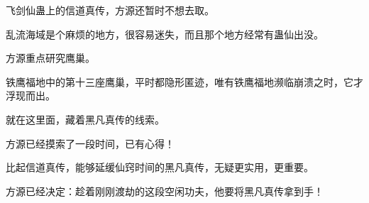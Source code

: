 \begin{this_body}
飞剑仙蛊上的信道真传，方源还暂时不想去取。

乱流海域是个麻烦的地方，很容易迷失，而且那个地方经常有蛊仙出没。

方源重点研究鹰巢。

铁鹰福地中的第十三座鹰巢，平时都隐形匿迹，唯有铁鹰福地濒临崩溃之时，它才浮现而出。

就在这里面，藏着黑凡真传的线索。

方源已经摸索了一段时间，已有心得！

比起信道真传，能够延缓仙窍时间的黑凡真传，无疑更实用，更重要。

方源已经决定：趁着刚刚渡劫的这段空闲功夫，他要将黑凡真传拿到手！

\end{this_body}

